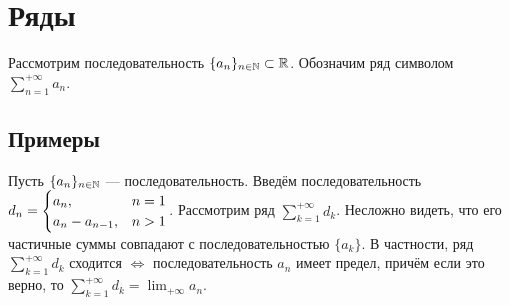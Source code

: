 \documentclass[a4paper]{report}
\begin{document}
    \section{Ряды}
    Рассмотрим последовательность $\{a_n\}_{n\in\mathbb{N}} \subset \mathbb{R}$.
    Обозначим ряд символом $\sum\limits_{n = 1}^{+\infty}a_n$.


    \subsection{Примеры}
    Пусть $\{a_n\}_{n\in\mathbb{N}}$ --- последовательность.
    Введём последовательность $d_n = \begin{cases}a_n,&n =1\\a_n - a_{n-1},&n>1\end{cases}$.
    Рассмотрим ряд $\sum\limits_{k = 1}^{+\infty}d_k$.
    Несложно видеть, что его частичные суммы совпадают с последовательностью $\{a_k\}$.
    В частности, ряд $\sum\limits_{k = 1}^{+\infty}d_k$ сходится $\iff$ последовательность $a_n$ имеет предел, причём если это верно, то $\sum\limits_{k = 1}^{+\infty}d_k = \lim_{+\infty}a_n$.
\end{document}
